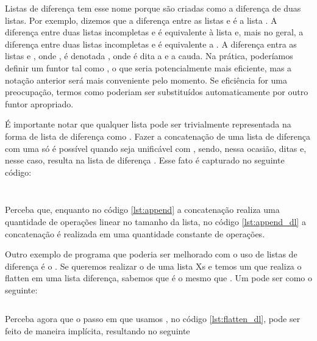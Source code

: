 \documentclass{article}
\begin{document}
Listas de diferença tem esse nome porque são criadas como a diferença de duas listas. Por exemplo, dizemos que  a diferença entre as listas
\codigo{[a,b,c]} e \codigo{[c]} é a lista \codigo{[a,b]}. A diferença entre duas listas incompletas \codigo{[a,b|Xs]} e  é equivalente à lista \codigo{[a,b]} e, mais no geral, a diferença entre duas listas incompletas \codigo{[$x_0$, ...,$x_i$|Xs]} e  é equivalente a \codigo{[$x_0$, ...,$x_i$]}.
A diferença entra as listas  e , onde , é denotada , onde  é dita a  e  a cauda. Na prática,
poderíamos definir um funtor tal como , o que seria potencialmente mais eficiente, mas a notação anterior será
mais conveniente pelo momento. Se eficiência for uma preocupação, termos como  poderiam ser substituídos automaticamente por outro funtor apropriado.

É importante notar que qualquer lista  pode ser trivialmente representada na forma de lista de diferença como . Fazer a concatenação de uma lista de diferença  com uma 
só é possível quando  seja unificável com , sendo, nessa ocasião, ditas   e, nesse caso, resulta na lista de diferença . Esse fato é capturado no seguinte código:

\inputminted{prolog}{../Exemplos/Cap3/prog5_concatenate_diff.pl}\label{lst:append_dl}
\inputminted{prolog}{../Exemplos/Cap3/prog3_flatten.pl}\label{lst:flatten}

Perceba que, enquanto no código \ref{lst:append} a concatenação realiza uma quantidade de operações linear no tamanho da lista,
no código \ref{lst:append_dl} a concatenação é realizada em uma quantidade constante de operações.

Outro exemplo de programa que poderia ser melhorado com o uso de listas de diferença é o
. Se queremos realizar o  de uma lista Xs e temos um
 que realiza o flatten em uma lista diferença, sabemos que
 é o mesmo que . Um
 pode ser como o seguinte:

\inputminted{prolog}{../Exemplos/Cap3/prog_flatten_dl1.pl}\label{lst:flatten_dl}

Perceba agora que o passo em que usamos , no código \ref{lst:flatten_dl}, pode ser feito de maneira implícita, resultando no seguinte
\end{document}
